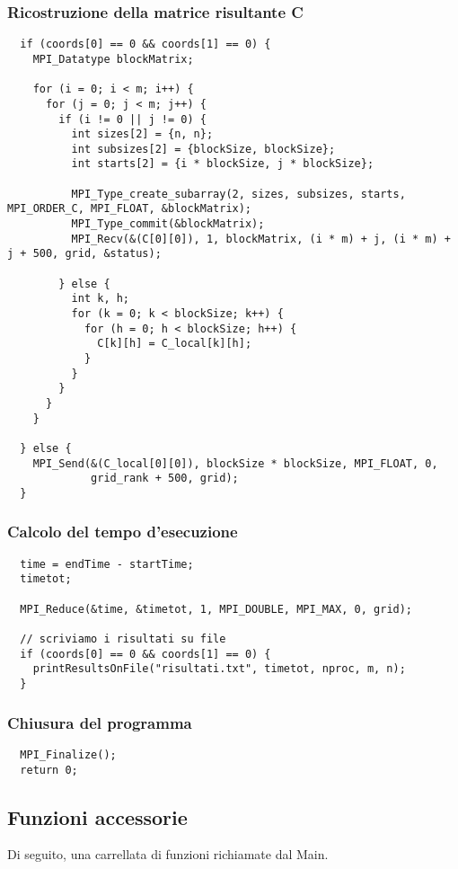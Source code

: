 \subsubsection{Ricostruzione della matrice risultante C}
\begin{lstlisting}
  if (coords[0] == 0 && coords[1] == 0) {
    MPI_Datatype blockMatrix;

    for (i = 0; i < m; i++) {
      for (j = 0; j < m; j++) {
        if (i != 0 || j != 0) {
          int sizes[2] = {n, n};
          int subsizes[2] = {blockSize, blockSize};
          int starts[2] = {i * blockSize, j * blockSize};

          MPI_Type_create_subarray(2, sizes, subsizes, starts, MPI_ORDER_C, MPI_FLOAT, &blockMatrix);
          MPI_Type_commit(&blockMatrix);
          MPI_Recv(&(C[0][0]), 1, blockMatrix, (i * m) + j, (i * m) + j + 500, grid, &status);

        } else {
          int k, h;
          for (k = 0; k < blockSize; k++) {
            for (h = 0; h < blockSize; h++) {
              C[k][h] = C_local[k][h];
            }
          }
        }
      }
    }

  } else {
    MPI_Send(&(C_local[0][0]), blockSize * blockSize, MPI_FLOAT, 0,
             grid_rank + 500, grid);
  }
\end{lstlisting}

\subsubsection{Calcolo del tempo d'esecuzione}
\begin{lstlisting}
  time = endTime - startTime;
  timetot;

  MPI_Reduce(&time, &timetot, 1, MPI_DOUBLE, MPI_MAX, 0, grid);

  // scriviamo i risultati su file
  if (coords[0] == 0 && coords[1] == 0) {
    printResultsOnFile("risultati.txt", timetot, nproc, m, n);
  }
\end{lstlisting}

\subsubsection{Chiusura del programma}
\begin{lstlisting}
  MPI_Finalize();
  return 0;
\end{lstlisting}

\subsection{Funzioni accessorie}
Di seguito, una carrellata di funzioni richiamate dal Main.
